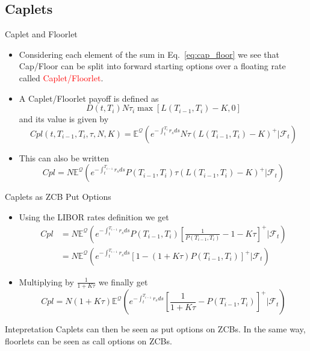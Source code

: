\documentclass{beamer}
\begin{document}
\subsection{Caplets}
\begin{frame}{Caplet and Floorlet}
	\begin{itemize}
		\item Considering each element of the sum in Eq.~\ref{eq:cap_floor} we see that Cap/Floor can be split into forward starting options over a floating rate called \textcolor{red}{Caplet/Floorlet}.
		\item A Caplet/Floorlet payoff is defined as
		\begin{equation}
			D(t,T_i)N\tau_i\max\left[L(T_{i-1},T_i)-K,0\right]
		\end{equation} 
		and its value is given by
		\begin{equation}
			Cpl(t,T_{i-1},T_i,\tau,N,K)=\mathbb{E}^{\mathcal{Q}}\left(e^{-\int_t^{T_i}r_s ds}N\tau(L(T_{i-1},T_i)-K)^+ | \mathcal{F}_t\right)
		\end{equation}
		\item This can also be written
		\begin{equation*}
			Cpl=N\mathbb{E}^{\mathcal{Q}}\left(e^{-\int_t^{T_{i-1}}r_s ds}P(T_{i-1},T_i)\tau(L(T_{i-1},T_i)-K)^+ | \mathcal{F}_t\right)
		\end{equation*}
	\end{itemize}
\end{frame}

\begin{frame}{Caplets as ZCB Put Options}
	\begin{itemize}
		\item Using the LIBOR rates definition we get
		\begin{equation*}
			\begin{aligned}
			Cpl &=N\mathbb{E}^{\mathcal{Q}}\left(e^{-\int_t^{T_{i-1}}r_s ds}P(T_{i-1},T_i)\left[\frac{1}{P(T_{i-1},T_i)}-1-K\tau\right]^+ | \mathcal{F}_t\right) \\
			& = 		N\mathbb{E}^{\mathcal{Q}}\left(e^{-\int_t^{T_{i-1}}r_s ds}\left[1-(1+K\tau)P(T_{i-1},T_i)\right]^+ | \mathcal{F}_t\right)
			\end{aligned}
		\end{equation*}
		\item Multiplying by $\frac{1}{1+K\tau}$ we finally get
		\begin{equation}
			Cpl=N(1+K\tau)\mathbb{E}^{\mathcal{Q}}\left(e^{-\int_t^{T_{i-1}}r_s ds}\left[\frac{1}{1+K\tau}-P(T_{i-1},T_i)\right]^+ | \mathcal{F}_t\right)
		\end{equation}
	\end{itemize}
	\begin{block}{Intepretation}
		Caplets can then be seen as put options on ZCBs. In the same way, floorlets can be seen as call options on ZCBs.
	\end{block}
\end{frame}
\end{document}
